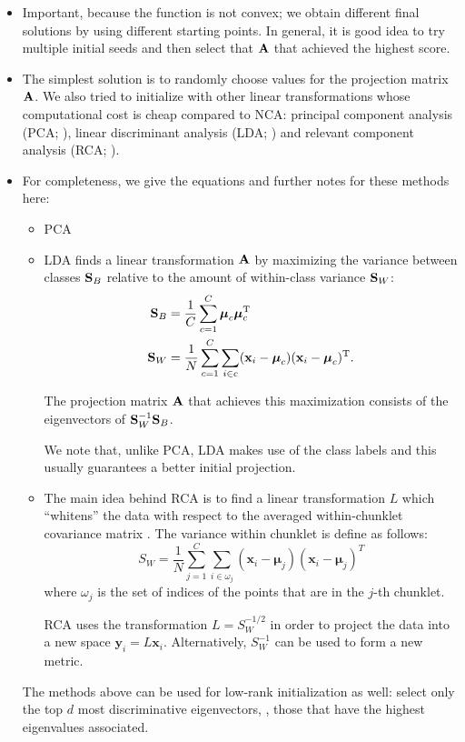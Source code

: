 \begin{itemize}
	\item Important, because the function is not convex; we obtain different final solutions by using different starting points. In general, it is good idea to try multiple initial seeds and then select that $\mathbf{A}$ that achieved the highest score.
	\item The simplest solution is to randomly choose values for the projection matrix $\mathbf{A}$. We also tried to initialize with other linear transformations whose computational cost is cheap compared to NCA: principal component analysis (PCA; \citealp{pearson1901}), linear discriminant analysis (LDA; \citealp{fisher1936}) and relevant component analysis (RCA; \citealp{bar2003}).
	\item For completeness, we give the equations and further notes for these methods here: 
		\begin{itemize}
			\item  PCA 
			
			\item LDA finds a linear transformation $\mathbf{A}$ by maximizing the variance between classes $\mathbf{S}_B$ relative to the amount of within-class variance $\mathbf{S}_W$:
			\begin{align}
			 \mathbf{S}_B &= \frac{1}{C}\sum_{c=1}^{C}\boldsymbol\mu_c\boldsymbol\mu_c^\textrm{T}\label{eq:lda-1}\\
			 \mathbf{S}_W &= \frac{1}{N}\sum_{c=1}^{C}\sum_{i \in c}(\mathbf{x}_i-\boldsymbol{\mu}_c)(\mathbf{x}_i-\boldsymbol{\mu}_c)^\textrm{T}.\label{eq:lda-2}
			\end{align}
			
			The projection matrix $\mathbf{A}$ that achieves this maximization consists of the eigenvectors of $\mathbf{S}_W^{-1}\mathbf{S}_B$. 
			
			We note that, unlike PCA, LDA makes use of the class labels and this usually guarantees a better initial projection.
			
			\item The main idea behind RCA is to find a linear transformation $L$ which ``whitens'' the data with respect to the averaged within-chunklet covariance matrix \cite{Weinberger2009}. The variance within chunklet is define as follows:
			\begin{equation}
			 S_W = \frac{1}{N}\sum_{j=1}^{C}\sum_{i\in\omega_j}(\mathbf{x}_i - \boldsymbol{\mu}_j)(\mathbf{x}_i - \boldsymbol{\mu}_j)^T
			\label{eq:rca-1}
			\end{equation}
			 where $\omega_j$ is the set of indices of the points that are in the $j$-th chunklet.
			
			RCA uses the transformation $L=S_W^{-1/2}$ in order to project the data into a new space $\mathbf{y}_i = L\mathbf{x}_i$. Alternatively, $S_W^{-1}$ can be used to form a new metric.
		\end{itemize}
		
		The methods above can be used for low-rank initialization as well: select only the top $d$ most discriminative eigenvectors, \ie, those that have the highest eigenvalues associated.
\end{itemize}

